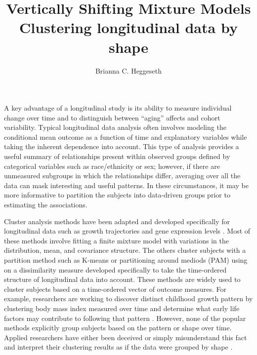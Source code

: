 \documentclass[12pt]{article}
\title{Vertically Shifting Mixture Models \\ Clustering longitudinal data by shape}
\author{Brianna C. Heggeseth}
\begin{document}
\maketitle

A key advantage of a longitudinal study is its ability to measure individual change over time and to distinguish between ``aging'' affects and cohort variability. Typical longitudinal data analysis often involves modeling the conditional mean outcome as a function of time and explanatory variables while taking the inherent dependence into account. This type of analysis provides a useful summary of relationships present within observed groups defined by categorical variables such as race/ethnicity or sex; however, if there are unmeasured subgroups in which the relationships differ, averaging over all the data can mask interesting and useful patterns. In these circumstances, it may be more informative to partition the subjects into data-driven groups prior to estimating the associations.

Cluster analysis methods have been adapted and developed specifically for longitudinal data such as growth trajectories and gene expression levels \cite{schneiderman1993,genolini2010, jones2001, muthen2010, mcnicholas2010}. Most of these methods involve fitting a finite mixture model with variations in the distribution, mean, and covariance structure. The others cluster subjects with a partition method such as K-means \cite{macqueen1967,hartigan1979,} or partitioning around mediods (PAM) \cite{kaufman1990} using on a dissimilarity measure developed specifically to take the time-ordered structure of longitudinal data into account. These methods are widely used to cluster subjects based on a time-ordered vector of outcome measures. For example, researchers are working to discover distinct childhood growth pattern by clustering body mass index measured over time and determine what early life factors may contribute to following that pattern \cite{pryor2011,carter2012}. However, none of the popular methods explicitly group subjects based on the pattern or shape over time. Applied researchers have either been deceived or simply misunderstand this fact and interpret their clustering results as if the data were grouped by shape \cite{pryor2011,carter2012,nagin1999}. 
\end{document}
